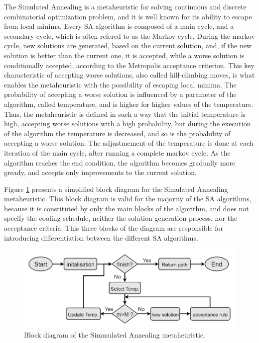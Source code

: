 The Simulated Annealing is a metaheuristic for solving continuous and discrete
combinatorial optimization problem, and it is well known for its ability to
escape from local minima. Every SA algorithm is composed of a main cycle, and a
secondary cycle, which is often refered to as the Markov cycle. During the
markov cycle, new solutions are generated, based on the current solution, and,
if the new solution is better than the current one, it is accepted, while a
worse solution is conditionally accepted, according to the Metropolis acceptance
criterion. This key characteristic of accepting worse solutions, also called
hill-climbing moves, is what enables the metaheuristic with the possibility of
escaping local minima. The probability of accepting a worse solution is
influenced by a parameter of the algorithm, called temperature, and is higher
for higher values of the temperature. Thus, the metaheuristic is defined in such
a way that the initial temperature is high, accepting worse solutions with a
high probability, but during the execution of the algorithm the temperature is
decreased, and so is the probability of accepting a worse solution. The
adjustmement of the temperature is done at each iteration of the main cycle,
after running a complete markov cycle. As the algorithm reaches the end
condition, the algorithm becomes gradually more gready, and accepts only
improvements to the current solution.

Figure \ref{fig:LBSA} presents a simplified block diagram for the Simulated
Annealing metaheuristic. This block diagram is valid for the majority of the SA
algorithms, because it is constituted by only the main blocks of the algorithm,
and does not specify the cooling schedule, neither the solution generation
process, nor the acceptance criteria. This three blocks of the diagram are
responsible for introducing differentiation between the different SA algorithms.

\begin{figure}[htpb]
  \centering
  \includegraphics[width=\textwidth]{./Figures/system_implementation/LBSA.png}
  \caption{Block diagram of the Simmulated Annealing metaheuristic.}
  \label{fig:LBSA}  
\end{figure}

